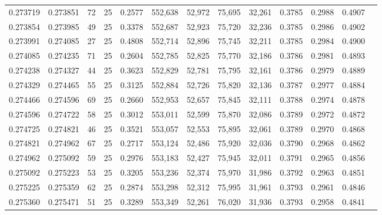\begin{tabular}{rrrrrrrrrrrrr}
0.273719 & 0.273851 &    72 &  25 &                                     0.2577 & 552,638 &  52,972 &  75,695 &  32,261 & 0.3785 & 0.2988 & 0.4907 \\
0.273854 & 0.273985 &    49 &  25 &                                     0.3378 & 552,687 &  52,923 &  75,720 &  32,236 & 0.3785 & 0.2986 & 0.4902 \\
0.273991 & 0.274085 &    27 &  25 &                                     0.4808 & 552,714 &  52,896 &  75,745 &  32,211 & 0.3785 & 0.2984 & 0.4900 \\
0.274085 & 0.274235 &    71 &  25 &                                     0.2604 & 552,785 &  52,825 &  75,770 &  32,186 & 0.3786 & 0.2981 & 0.4893 \\
0.274238 & 0.274327 &    44 &  25 &                                     0.3623 & 552,829 &  52,781 &  75,795 &  32,161 & 0.3786 & 0.2979 & 0.4889 \\
0.274329 & 0.274465 &    55 &  25 &                                     0.3125 & 552,884 &  52,726 &  75,820 &  32,136 & 0.3787 & 0.2977 & 0.4884 \\
0.274466 & 0.274596 &    69 &  25 &                                     0.2660 & 552,953 &  52,657 &  75,845 &  32,111 & 0.3788 & 0.2974 & 0.4878 \\
0.274596 & 0.274722 &    58 &  25 &                                     0.3012 & 553,011 &  52,599 &  75,870 &  32,086 & 0.3789 & 0.2972 & 0.4872 \\
0.274725 & 0.274821 &    46 &  25 &                                     0.3521 & 553,057 &  52,553 &  75,895 &  32,061 & 0.3789 & 0.2970 & 0.4868 \\
0.274821 & 0.274962 &    67 &  25 &                                     0.2717 & 553,124 &  52,486 &  75,920 &  32,036 & 0.3790 & 0.2968 & 0.4862 \\
0.274962 & 0.275092 &    59 &  25 &                                     0.2976 & 553,183 &  52,427 &  75,945 &  32,011 & 0.3791 & 0.2965 & 0.4856 \\
0.275092 & 0.275223 &    53 &  25 &                                     0.3205 & 553,236 &  52,374 &  75,970 &  31,986 & 0.3792 & 0.2963 & 0.4851 \\
0.275225 & 0.275359 &    62 &  25 &                                     0.2874 & 553,298 &  52,312 &  75,995 &  31,961 & 0.3793 & 0.2961 & 0.4846 \\
0.275360 & 0.275471 &    51 &  25 &                                     0.3289 & 553,349 &  52,261 &  76,020 &  31,936 & 0.3793 & 0.2958 & 0.4841 \\

\end{tabular}
